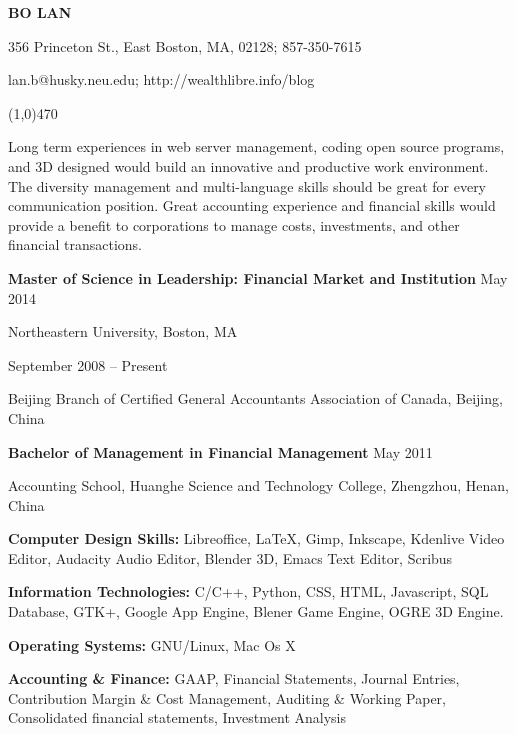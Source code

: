 \documentclass[10pt]{article}
\begin{document}
\centerline{\large \bf BO LAN}

\centerline{356 Princeton St., East Boston, MA, 02128; 857-350-7615}

\centerline{lan.b@husky.neu.edu; http://wealthlibre.info/blog}

\noindent

\centerline{\line(1,0){470}}

\medskip


\noindent
Long term experiences in web server management, coding open source programs, and 3D designed would build an innovative and productive work environment. The diversity management and multi-language skills should be great for every communication position. Great accounting experience and financial skills would provide a benefit to corporations to manage costs, investments, and other financial transactions.

\medskip


\noindent
{\bf Master of Science in Leadership: Financial Market and Institution} \hfill May 2014

\noindent
Northeastern University, Boston, MA

\smallskip

 \hfill  September 2008 -- Present

\noindent Beijing Branch of Certified General Accountants Association of Canada, Beijing, China

\smallskip

\noindent
{\bf Bachelor of Management in Financial Management} \hfill May 2011

\noindent
Accounting School, Huanghe Science and Technology College, Zhengzhou, Henan, China

\medskip


\noindent
{\bf Computer Design Skills:} Libreoffice, {\LaTeX}, Gimp, Inkscape, Kdenlive Video Editor, Audacity Audio Editor, Blender 3D, Emacs Text Editor, Scribus

\noindent
{\bf Information Technologies:} C/C++, Python, CSS, HTML, Javascript, SQL Database, GTK+, Google App Engine, Blener Game Engine, OGRE 3D Engine.

\noindent
{\bf Operating Systems:} GNU/Linux, Mac Os X

\noindent
{\bf Accounting \& Finance:} GAAP, Financial Statements, Journal Entries, Contribution Margin \& Cost Management, Auditing \& Working Paper, Consolidated financial statements, Investment Analysis
\end{document}
